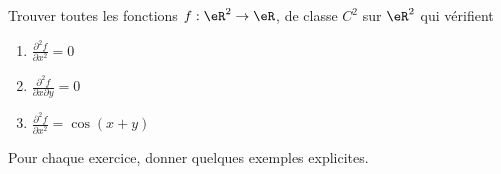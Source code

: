 \begin{exercice}[\minsyndical]\label{exoCalculDifferentiel0012}

Trouver toutes les fonctions $f:\eR^2\to\eR$, de classe $C^2$ sur $\eR^2$ qui vérifient
\begin{enumerate}
	\item
 $\displaystyle\frac{\partial^2 f}{\partial x^2} = 0$
	\item	
  $\displaystyle\frac{\partial^2 f}{\partial x \partial y} = 0 $
  \item\boringexo
  $\displaystyle\frac{\partial^2 f}{\partial x^2} = \cos(x+y)$
\end{enumerate}

Pour chaque exercice, donner quelques exemples explicites.


\end{exercice}
